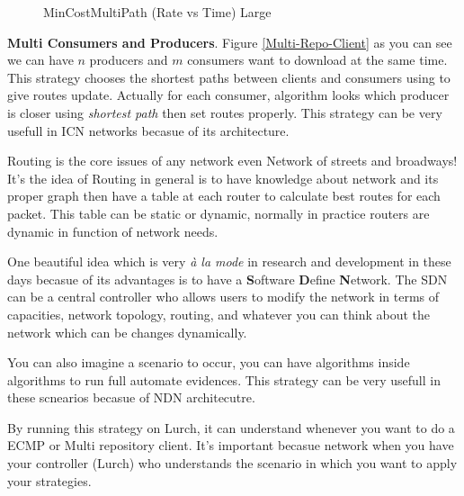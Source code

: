 \begin{figure}[H]
\begin{center}
\caption{MinCostMultiPath (Rate vs Time) Large} \label{mincostmultipath} 


\end{center}

\end{figure}


\textbf{\Large{Multi Consumers and Producers}}. Figure \ref{Multi-Repo-Client} as you can see we can have $n$ producers and $m$ consumers want to download at the same time. This strategy chooses the shortest paths between clients and consumers using to give routes update. Actually for each consumer, algorithm looks which producer is closer using \textit{shortest path} then set routes properly. This strategy can be very usefull in ICN networks becasue of its architecture. 

Routing is the core issues of any network even Network of streets and broadways! It's the idea of Routing in general is to have knowledge about network and its proper graph then have a table at each router to calculate best routes for each packet. This table can be static or dynamic, normally in practice routers are dynamic in function of network needs. 

One beautiful idea which is very \textit{à la mode} in research and development in these days becasue of its advantages is to have a \textbf{S}oftware \textbf{D}efine \textbf{N}etwork. The SDN can be a central controller who allows users to modify the network in terms of capacities, network topology, routing, and whatever you can think about the network which can be changes dynamically.

You can also imagine a scenario to occur, you can have algorithms inside algorithms to run full automate evidences. This strategy can be very usefull in these scnearios becasue of NDN architecutre.

By running this strategy on Lurch, it can understand whenever you want to do a ECMP or Multi repository client. It's important becasue network when you have your controller (Lurch) who understands the scenario in which you want to apply your strategies. 

  


